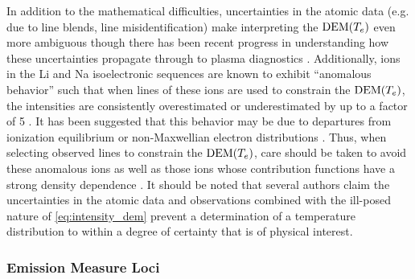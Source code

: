 In addition to the mathematical difficulties, uncertainties in the atomic data (e.g. due to line blends, line misidentification) make interpreting the $\textup{DEM}(T_e)$ even more ambiguous though there has been recent progress in understanding how these uncertainties propagate through to plasma diagnostics \citep[e.g.][]{guennou_can_2013,yu_incorporating_2018,del_zanna_uncertainties_2019}. Additionally, ions in the Li and Na isoelectronic sequences are known to exhibit ``anomalous behavior'' such that when lines of these ions are used to constrain the $\textup{DEM}(T_e)$, the intensities are consistently overestimated or underestimated by up to a factor of 5 \citep{burton_w._m._discussion_1971,dupree_analysis_1972,del_zanna_spectroscopic_2002}. It has been suggested that this behavior may be due to departures from ionization equilibrium or non-Maxwellian electron distributions \citep{del_zanna_solar_2018}. Thus, when selecting observed lines to constrain the $\textup{DEM}(T_e)$, care should be taken to avoid these anomalous ions as well as those ions whose contribution functions have a strong density dependence \citep[e.g. Fe IX,][]{del_zanna_solar_2018}. It should be noted that several authors \citep{craig_fundamental_1976,judge_failure_1995,judge_fundamental_1997,judge_coronal_2010} claim the uncertainties in the atomic data and observations combined with the ill-posed nature of \autoref{eq:intensity_dem} prevent a determination of a temperature distribution to within a degree of certainty that is of physical interest.

\subsubsection{Emission Measure Loci}


